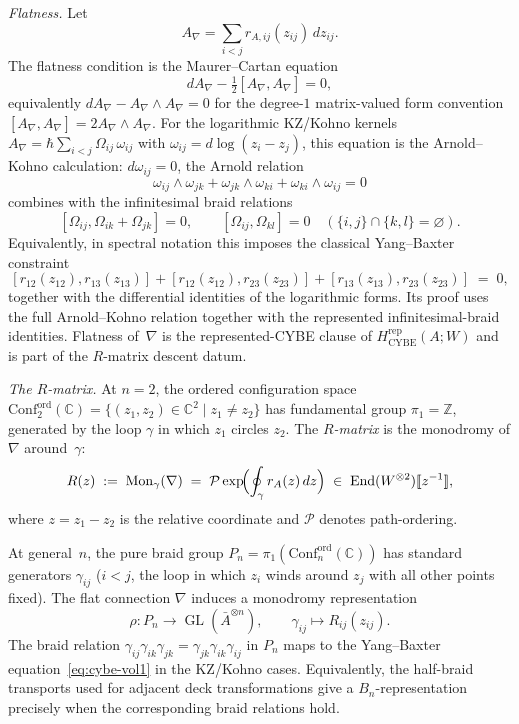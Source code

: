 \begin{construction}
\emph{Flatness.}
Let
\[
A_\nabla=\sum_{i<j}r_{A,ij}(z_{ij})\,dz_{ij}.
\]
The flatness condition is the Maurer--Cartan equation
\[
dA_\nabla-\tfrac{1}{2}[A_\nabla,A_\nabla]=0,
\]
equivalently $dA_\nabla-A_\nabla\wedge A_\nabla=0$ for the
degree-$1$ matrix-valued form convention
$[A_\nabla,A_\nabla]=2A_\nabla\wedge A_\nabla$.
For the logarithmic KZ/Kohno kernels
$A_\nabla=\hbar\sum_{i<j}\Omega_{ij}\,\omega_{ij}$ with
$\omega_{ij}=d\log(z_i-z_j)$, this equation is the Arnold--Kohno
calculation: $d\omega_{ij}=0$, the Arnold relation
\[
\omega_{ij}\wedge\omega_{jk}
+\omega_{jk}\wedge\omega_{ki}
+\omega_{ki}\wedge\omega_{ij}=0
\]
combines with the infinitesimal braid relations
\[
[\Omega_{ij},\Omega_{ik}+\Omega_{jk}]=0,\qquad
[\Omega_{ij},\Omega_{kl}]=0
\quad(\{i,j\}\cap\{k,l\}=\varnothing).
\]
Equivalently, in spectral notation this imposes the classical
Yang--Baxter constraint
\begin{equation}\label{eq:cybe-vol1}
[r_{12}(z_{12}),r_{13}(z_{13})]
+[r_{12}(z_{12}),r_{23}(z_{23})]
+[r_{13}(z_{13}),r_{23}(z_{23})]
\;=\;0,
\end{equation}
together with the differential identities of the logarithmic forms.
Its proof uses the full Arnold--Kohno relation together with the
represented infinitesimal-braid identities.
Flatness of~$\nabla$ is the represented-CYBE clause of
$H_{\mathrm{CYBE}}^{\mathrm{rep}}(A;W)$ and is part of the
$R$-matrix descent datum.

\emph{The $R$-matrix.}
At $n=2$, the ordered configuration space
$\mathrm{Conf}_2^{\mathrm{ord}}(\mathbb{C})
=\{(z_1,z_2)\in\mathbb{C}^2\mid z_1\neq z_2\}$
has fundamental group $\pi_1=\mathbb{Z}$, generated by the
loop $\gamma$ in which $z_1$ circles $z_2$.
The \emph{$R$-matrix} is the monodromy of $\nabla$ around~$\gamma$:
\begin{equation}\label{eq:r-matrix-monodromy-vol1}
R(z)
\;:=\;
\operatorname{Mon}_\gamma(\nabla)
\;=\;
\mathcal{P}\exp\!\Bigl(
\oint_\gamma r_A(z)\,dz
\Bigr)
\;\in\;
\operatorname{End}(W^{\otimes2})[\![z^{-1}]\!],
\end{equation}
where $z=z_1-z_2$ is the relative coordinate and $\mathcal{P}$ denotes
path-ordering.

At general~$n$, the pure braid group
$P_n=\pi_1(\mathrm{Conf}_n^{\mathrm{ord}}(\mathbb{C}))$
has standard generators $\gamma_{ij}$ ($i<j$, the loop in which $z_i$
winds around $z_j$ with all other points fixed). The flat connection
$\nabla$ induces a monodromy representation
\[
\rho\colon P_n\to\operatorname{GL}(\bar A^{\otimes n}),
\qquad
\gamma_{ij}\mapsto R_{ij}(z_{ij}).
\]
The braid relation $\gamma_{ij}\gamma_{ik}\gamma_{jk}
=\gamma_{jk}\gamma_{ik}\gamma_{ij}$ in $P_n$ maps to the
Yang--Baxter equation~\eqref{eq:cybe-vol1} in the KZ/Kohno cases.
Equivalently, the half-braid transports used for adjacent deck
transformations give a $B_n$-representation precisely when the
corresponding braid relations hold.
\end{construction}

